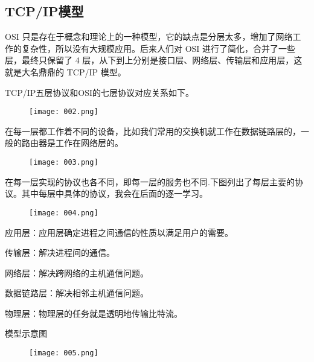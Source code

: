 \documentclass[cn,chinese,color=cyan]{elegantbook}
\begin{document}
\subsection{TCP/IP模型}
OSI 只是存在于概念和理论上的一种模型，它的缺点是分层太多，增加了网络工作的复杂性，所以没有大规模应用。后来人们对 OSI 进行了简化，合并了一些层，最终只保留了 4 层，从下到上分别是接口层、网络层、传输层和应用层，这就是大名鼎鼎的 TCP/IP 模型。

 TCP/IP五层协议和OSI的七层协议对应关系如下。
\begin{figure}[H]
	\centering
	\texttt{[image: 002.png]}
\end{figure}

在每一层都工作着不同的设备，比如我们常用的交换机就工作在数据链路层的，一般的路由器是工作在网络层的。
\begin{figure}[H]
	\centering
	\texttt{[image: 003.png]}
\end{figure}
在每一层实现的协议也各不同，即每一层的服务也不同.下图列出了每层主要的协议。其中每层中具体的协议，我会在后面的逐一学习。
\begin{figure}[H]
	\centering
	\texttt{[image: 004.png]}
\end{figure}

应用层：应用层确定进程之间通信的性质以满足用户的需要。

传输层：解决进程间的通信。

网络层：解决跨网络的主机通信问题。

数据链路层：解决相邻主机通信问题。

物理层：物理层的任务就是透明地传输比特流。



模型示意图
\begin{figure}[H]
	\centering
	\texttt{[image: 005.png]}
\end{figure}
\end{document}
